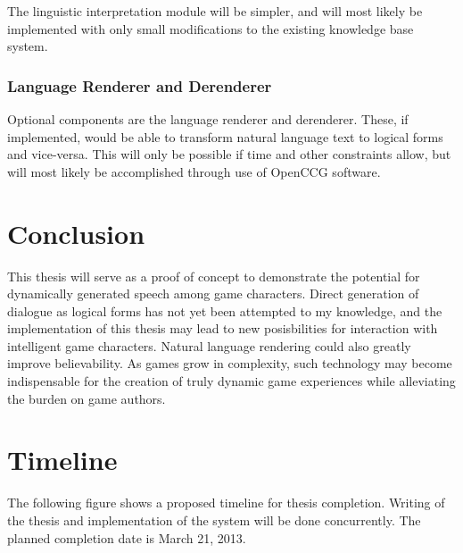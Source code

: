 \documentclass{article}
\begin{document}
The linguistic interpretation module will be simpler, and will most likely be
implemented with only small modifications to the existing knowledge base system.

\subsubsection{Language Renderer and Derenderer}

Optional components are the language renderer and derenderer.  These, if implemented,
would be able to transform natural language text to logical forms and vice-versa.
This will only be possible if time and other constraints allow, but will most likely
be accomplished through use of OpenCCG\cite{White2011} software.

\section{Conclusion}

This thesis will serve as a proof of concept to demonstrate the potential for dynamically
generated speech among game characters.  Direct generation of dialogue as logical forms
has not yet been attempted to my knowledge, and the implementation of this thesis may
lead to new posisbilities for interaction with intelligent game characters.  Natural language
rendering could also greatly improve believability.  As games grow in complexity, such
technology may become indispensable for the creation of truly dynamic game experiences
while alleviating the burden on game authors.

\section{Timeline}

The following figure shows a proposed timeline for thesis completion.  Writing of the thesis and implementation of the system will be done concurrently.  The planned completion date is March 21, 2013.

\begin{figure}[htbp!]
\end{figure}


{}
\end{document}
